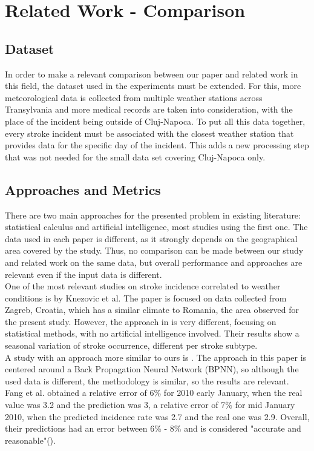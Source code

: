 \documentclass{article}
\begin{document}
\newpage
\section{Related Work - Comparison}

\subsection{Dataset}

In order to make a relevant comparison between our paper and related work in this field, the dataset used in the experiments must be extended. For this, more meteorological data is collected from multiple weather stations across Transylvania and more medical records are taken into consideration, with the place of the incident being outside of Cluj-Napoca. To put all this data together, every stroke incident must be associated with the closest weather station that provides data for the specific day of the incident. This adds a new processing step that was not needed for the small data set covering Cluj-Napoca only. 

\subsection{Approaches and Metrics}

There are two main approaches for the presented problem in existing literature: statistical calculus and artificial intelligence, most studies using the first one. The data used in each paper is different, as it strongly depends on the geographical area covered by the study. Thus, no comparison can be made between our study and related work on the same data, but overall performance and approaches are relevant even if the input data is different. 
\\

One of the most relevant studies on stroke incidence correlated to weather conditions is by Knezovic et al. The paper is focused on data collected from Zagreb, Croatia, which has a similar climate to Romania, the area observed for the present study. However, the approach in \cite{Knezovic:2018dg} is very different, focusing on statistical methods, with no artificial intelligence involved. Their results show a seasonal variation of stroke occurrence, different per stroke subtype. 
\\

A study with an approach more similar to ours is \cite{Fang:2014dg}. The approach in this paper is centered around a Back Propagation Neural Network (BPNN), so although the used data is different, the methodology is similar, so the results are relevant. Fang et al. obtained a relative error of 6\% for 2010 early January, when the real value was 3.2 and the prediction was 3, a relative error of 7\% for mid January 2010, when the predicted incidence rate was 2.7 and the real one was 2.9. Overall, their predictions had an error between 6\% - 8\% and is considered "accurate and reasonable"(\cite{Fang:2014dg}).
\end{document}
